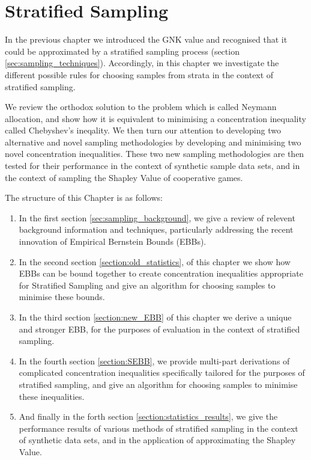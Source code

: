 \chapter{Stratified Sampling}\label{chap:stratified_sampling_chapter}

In the previous chapter we introduced the GNK value and recognised that it could be approximated by a stratified sampling process (section \ref{sec:sampling_techniques}).
Accordingly, in this chapter we investigate the different possible rules for choosing samples from strata in the context of stratified sampling.

We review the orthodox solution to the problem which is called Neymann allocation, and show how it is equivalent to minimising a concentration inequality called Chebyshev's ineqality.
We then turn our attention to developing two alternative and novel sampling methodologies by developing and minimising two novel concentration inequalities.
These two new sampling methodologies are then tested for their performance in the context of synthetic sample data sets, and in the context of sampling the Shapley Value of cooperative games.

The structure of this Chapter is as follows:
\begin{enumerate}
\item	In the first section \ref{sec:sampling_background}, we give a review of relevent background information and techniques, particularly addressing the recent innovation of Empirical Bernstein Bounds (EBBs).
\item	In the second section \ref{section:old_statistics}, of this chapter we show how EBBs can be bound together to create concentration inequalities appropriate for Stratified Sampling and give an algorithm for choosing samples to minimise these bounds.
\item	In the third section \ref{section:new_EBB} of this chapter we derive a unique and stronger EBB, for the purposes of evaluation in the context of stratified sampling.
\item	In the fourth section \ref{section:SEBB}, we provide multi-part derivations of complicated concentration inequalities specifically tailored for the purposes of stratified sampling, and give an algorithm for choosing samples to minimise these inequalities.
\item	And finally in the forth section \ref{section:statistics_results}, we give the performance results of various methods of stratified sampling in the context of synthetic data sets, and in the application of approximating the Shapley Value.
\end{enumerate}


